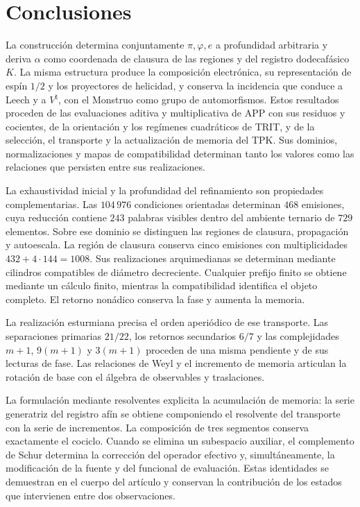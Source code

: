 \section{Conclusiones}
\label{sec:conclusiones}
\begingroup
\fontsize{10.5}{13}\selectfont
\setlength{\parskip}{2pt plus 1pt minus .5pt}

La construcción determina conjuntamente \(\pi,\varphi,e\) a profundidad
arbitraria y deriva \(\alpha\) como coordenada de clausura de las regiones
y del registro dodecafásico \(K\). La misma estructura produce la
composición electrónica, su representación de espín \(1/2\) y los
proyectores de helicidad, y conserva la incidencia que conduce a Leech
y a \(V^\natural\), con el Monstruo como grupo de automorfismos.
Estos resultados proceden de las evaluaciones aditiva y multiplicativa
de APP con sus residuos y cocientes, de la orientación y los regímenes
cuadráticos de TRIT, y de la selección, el transporte y la actualización
de memoria del TPK. Sus dominios, normalizaciones y mapas de
compatibilidad determinan tanto los valores como las relaciones que
persisten entre sus realizaciones.

La exhaustividad inicial y la profundidad del refinamiento son propiedades complementarias. Las \(104\,976\) condiciones orientadas determinan \(468\) emisiones, cuya reducción contiene \(243\) palabras visibles dentro del ambiente ternario de \(729\) elementos. Sobre ese dominio se distinguen las regiones de clausura, propagación y autoescala. La región de clausura conserva cinco emisiones con multiplicidades \(432+4\cdot144=1008\). Sus realizaciones arquimedianas se determinan mediante cilindros compatibles de diámetro decreciente. Cualquier prefijo finito se obtiene mediante un cálculo finito, mientras la compatibilidad identifica el objeto completo. El retorno nonádico conserva la fase y aumenta la memoria.

La realización esturmiana precisa el orden aperiódico de ese transporte. Las separaciones primarias \(21/22\), los retornos secundarios \(6/7\) y las complejidades \(m+1\), \(9(m+1)\) y \(3(m+1)\) proceden de una misma pendiente y de sus lecturas de fase. Las relaciones de Weyl y el incremento de memoria articulan la rotación de base con el álgebra de observables y traslaciones.

La formulación mediante resolventes explicita la acumulación de memoria: la serie generatriz del registro afín se obtiene componiendo el resolvente del transporte con la serie de incrementos. La composición de tres segmentos conserva exactamente el cociclo. Cuando se elimina un subespacio auxiliar, el complemento de Schur determina la corrección del operador efectivo y, simultáneamente, la modificación de la fuente y del funcional de evaluación. Estas identidades se demuestran en el cuerpo del artículo y conservan la contribución de los estados que intervienen entre dos observaciones.

